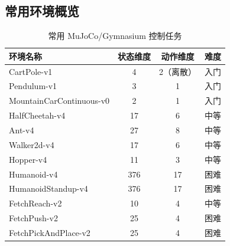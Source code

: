 \subsection{常用环境概览}

\begin{table}[htbp]
\centering
\caption{常用 MuJoCo/Gymnasium 控制任务}
\label{tab:envs}
\begin{tabular}{lccc}
\toprule
环境名称 & 状态维度 & 动作维度 & 难度 \\
\midrule
CartPole-v1 & 4 & 2（离散） & 入门 \\
Pendulum-v1 & 3 & 1 & 入门 \\
MountainCarContinuous-v0 & 2 & 1 & 入门 \\
HalfCheetah-v4 & 17 & 6 & 中等 \\
Ant-v4 & 27 & 8 & 中等 \\
Walker2d-v4 & 17 & 6 & 中等 \\
Hopper-v4 & 11 & 3 & 中等 \\
Humanoid-v4 & 376 & 17 & 困难 \\
HumanoidStandup-v4 & 376 & 17 & 困难 \\
FetchReach-v2 & 10 & 4 & 中等 \\
FetchPush-v2 & 25 & 4 & 困难 \\
FetchPickAndPlace-v2 & 25 & 4 & 困难 \\
\bottomrule
\end{tabular}
\end{table}

